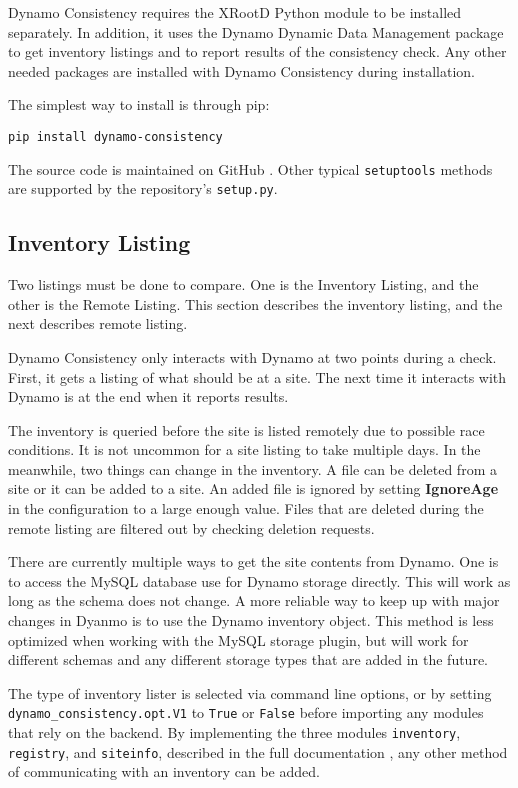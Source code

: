 Dynamo Consistency requires the XRootD \cite{dorigo2005xrootd}
Python module to be installed separately.
In addition, it uses the Dynamo Dynamic Data Management package to get inventory listings
and to report results of the consistency check.
Any other needed packages are installed with Dynamo Consistency during installation.

The simplest way to install is through pip:

\begin{verbatim}
pip install dynamo-consistency
\end{verbatim}

The source code is maintained on GitHub \cite{dynamo_consistency_src}.
Other typical \texttt{setuptools} methods are supported by
the repository’s \texttt{setup.py}.

\subsection{Inventory Listing}

Two listings must be done to compare.
One is the Inventory Listing,
and the other is the Remote Listing.
This section describes the inventory listing, and the next describes remote listing.

Dynamo Consistency only interacts with Dynamo at two points during a check.
First, it gets a listing of what should be at a site.
The next time it interacts with Dynamo is at the end when it reports results.

The inventory is queried before the site is listed remotely due to possible race conditions.
It is not uncommon for a site listing to take multiple days.
In the meanwhile, two things can change in the inventory.
A file can be deleted from a site or it can be added to a site.
An added file is ignored by setting {\bf IgnoreAge}
in the configuration to a large enough value.
Files that are deleted during the remote listing
are filtered out by checking deletion requests.

There are currently multiple ways to get the site contents from Dynamo.
One is to access the MySQL database use for Dynamo storage directly.
This will work as long as the schema does not change.
A more reliable way to keep up with major changes in Dyanmo
is to use the Dynamo inventory object.
This method is less optimized when working with the MySQL storage plugin,
but will work for different schemas and any different storage types
that are added in the future.

The type of inventory lister is selected via command line options,
or by setting \texttt{dynamo\_consistency.opt.V1} to \texttt{True} or \texttt{False}
before importing any modules that rely on the backend.
By implementing the three modules \texttt{inventory}, \texttt{registry},
and \texttt{siteinfo}, described in the full documentation \cite{dynamo-consistency},
any other method of communicating with an inventory can be added.

